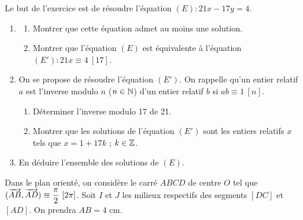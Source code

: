 \documentclass[11pt]{article}
\begin{document}


Le but de l'exercice est de résoudre l'équation $(E) : 21x - 17y = 4$.

\begin{enumerate}
  \item \begin{enumerate}[label=\alph*.]
    \item Montrer que cette équation admet au moins une solution.
    \item Montrer que l'équation $(E)$ est équivalente à l'équation $(E') : 21x \equiv 4\ [17]$.
  \end{enumerate}
  \item On se propose de résoudre l'équation $(E')$. On rappelle qu'un entier relatif $a$ est l'inverse modulo $n$ ($n \in \mathbb{N}$) d'un entier relatif $b$ si $ab \equiv 1\ [n]$.
  \begin{enumerate}[label=\alph*.]
    \item Déterminer l'inverse modulo 17 de 21.
    \item Montrer que les solutions de l'équation $(E')$ sont les entiers relatifs $x$ tels que $x = 1 + 17k$ ; $k \in \mathbb{Z}$.
  \end{enumerate}
  \item En déduire l'ensemble des solutions de $(E)$.
\end{enumerate}


Dans le plan orienté, on considère le carré $ABCD$ de centre $O$ tel que $(\overrightarrow{AB},\overrightarrow{AD}) \equiv \dfrac{\pi}{2}\ [2\pi]$. Soit $I$ et $J$ les milieux respectifs des segments $[DC]$ et $[AD]$. On prendra $AB = 4$ cm.
\end{document}
